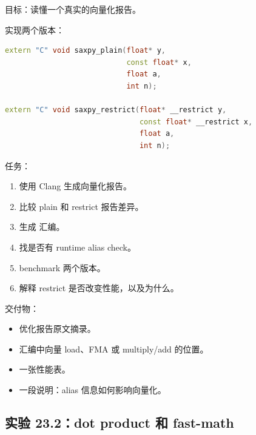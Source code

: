 \begin{labbox}
目标：读懂一个真实的向量化报告。

实现两个版本：

\begin{lstlisting}[language=C++]
extern "C" void saxpy_plain(float* y,
                            const float* x,
                            float a,
                            int n);

extern "C" void saxpy_restrict(float* __restrict y,
                               const float* __restrict x,
                               float a,
                               int n);
\end{lstlisting}

任务：

\begin{enumerate}
  \item 使用 Clang 生成向量化报告。
  \item 比较 plain 和 restrict 报告差异。
  \item 生成  汇编。
  \item 找是否有 runtime alias check。
  \item benchmark 两个版本。
  \item 解释 restrict 是否改变性能，以及为什么。
\end{enumerate}

交付物：

\begin{itemize}
  \item 优化报告原文摘录。
  \item 汇编中向量 load、FMA 或 multiply/add 的位置。
  \item 一张性能表。
  \item 一段说明：alias 信息如何影响向量化。
\end{itemize}
\end{labbox}

\subsection{实验 23.2：dot product 和 fast-math}

